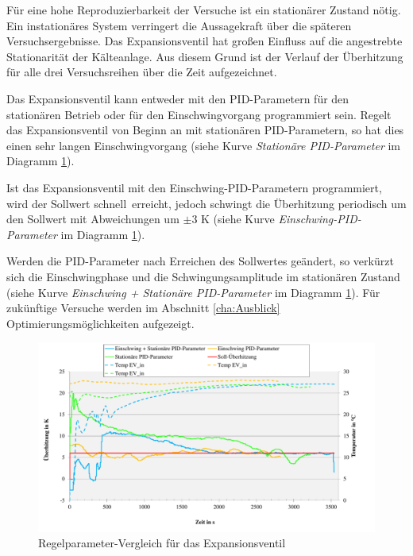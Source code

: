 Für eine hohe Reproduzierbarkeit der Versuche ist ein stationärer Zustand nötig. Ein instationäres System verringert die Aussagekraft über die späteren Versuchsergebnisse. Das Expansionsventil hat großen Einfluss auf die angestrebte Stationarität der Kälteanlage. Aus diesem Grund ist der Verlauf der Überhitzung für alle drei Versuchsreihen  über die Zeit aufgezeichnet. 

Das Expansionsventil kann entweder mit den PID-Parametern für den stationären Betrieb oder für den Einschwingvorgang programmiert sein. Regelt das Expansionsventil von Beginn an mit stationären PID-Parametern, so hat dies einen sehr langen Einschwingvorgang (siehe Kurve \textit{Stationäre PID-Parameter} im Diagramm \ref{fig:EV_Vergleich}).

Ist das Expansionsventil mit den Einschwing-PID-Parametern programmiert, wird der Sollwert schnell~erreicht, jedoch schwingt die Überhitzung periodisch um den Sollwert mit Abweichungen um $\pm 3$ K (siehe Kurve \textit{Einschwing-PID-Parameter} im Diagramm \ref{fig:EV_Vergleich}). 

Werden die PID-Parameter nach Erreichen des Sollwertes geändert, so verkürzt sich die Einschwingphase und die Schwingungsamplitude im stationären Zustand (siehe Kurve \textit{Einschwing + Stationäre PID-Parameter} im Diagramm \ref{fig:EV_Vergleich}). Für zukünftige Versuche werden im Abschnitt \ref{cha:Ausblick} Optimierungsmöglichkeiten aufgezeigt. 

\begin{figure}[htb]
\centering		\includegraphics[page=1,width=1.08\textwidth]{Pictures/Inbetriebnahme/EV_Vergleich.pdf}
\caption{Regelparameter-Vergleich für das Expansionsventil}
\label{fig:EV_Vergleich}
\end{figure}



